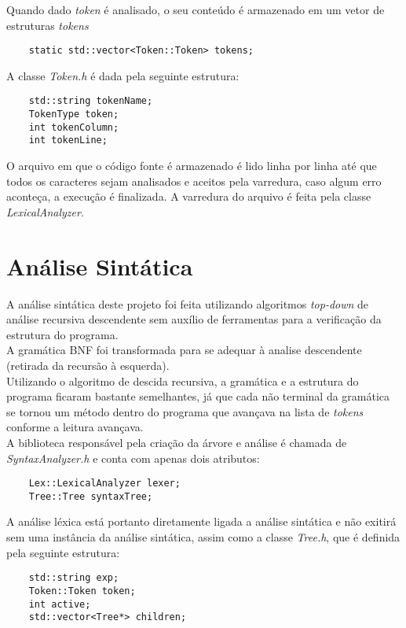 \documentclass[12pt,a4paper,final]{article}
\begin{document}
Quando dado \textit{token} é analisado, o seu conteúdo é armazenado em um vetor de estruturas \textit{tokens}

\begin{lstlisting}
	static std::vector<Token::Token> tokens;
\end{lstlisting}

A classe \textit{Token.h} é dada pela seguinte estrutura:

\begin{lstlisting}
	std::string tokenName;
	TokenType token;
	int tokenColumn;
	int tokenLine;
\end{lstlisting}

O arquivo em que o código fonte é armazenado é lido linha por linha até que todos os caracteres sejam analisados e aceitos pela varredura, caso algum erro aconteça, a execução é finalizada.
A varredura do arquivo é feita pela classe \textit{LexicalAnalyzer}.

\section*{Análise Sintática}
A análise sintática deste projeto foi feita utilizando algoritmos \textit{top-down} de análise recursiva descendente sem auxílio de ferramentas para a verificação da estrutura do programa.\\
A gramática BNF foi transformada para se adequar à analise descendente (retirada da recursão à esquerda).\\
Utilizando o algoritmo de descida recursiva, a gramática e a estrutura do programa ficaram bastante semelhantes, já que cada não terminal da gramática se tornou um método dentro do programa que avançava na lista de \textit{tokens} conforme a leitura avançava.\\

A biblioteca responsável pela criação da árvore e análise é chamada de \textit{SyntaxAnalyzer.h} e  conta com apenas dois atributos:

\begin{lstlisting}
	Lex::LexicalAnalyzer lexer;
	Tree::Tree syntaxTree;
\end{lstlisting}

A análise léxica está portanto diretamente ligada a análise sintática e não exitirá sem uma instância da análise sintática, assim como a classe \textit{Tree.h}, que é definida pela seguinte estrutura:

\begin{lstlisting}
	std::string exp;
	Token::Token token;
	int active;
	std::vector<Tree*> children;
\end{lstlisting}
\end{document}
